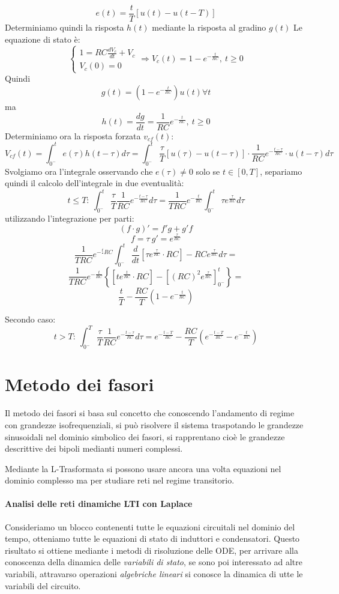 $$
e(t) = \frac{t}{T}\left[u(t) - u(t-T)\right]
$$
Determiniamo quindi la risposta $h(t)$ mediante la risposta al gradino $g(t)$
Le equazione di stato è:
$$
\begin{cases}
1 = RC\frac{dV_c}{dt} + V_c \\
V_c(0) = 0 
\end{cases}
\Rightarrow V_c(t) = 1 - e^{-\frac{t}{RC}},\ t\geq 0$$
Quindi 
$$
g(t) = (1 - e^{-\frac{t}{RC}})u(t) \forall t
$$
ma
$$
h(t) = \frac{dg}{dt} = \frac{1}{RC}e^{-\frac{t}{RC}},\ t\geq 0
$$
Determiniamo ora la risposta forzata $v_{cf}(t)$:
$$
V_{cf}(t) = \int_{0^-}^{t} e(\tau) h(t-\tau)d\tau = \int_{0^-}^{t}\frac{\tau}{T}\left[u(\tau) - u(t-\tau)\right]
\cdot \frac{1}{RC} e ^{-\frac{t-\tau}{RC}}\cdot u(t-\tau)d\tau
$$
Svolgiamo ora l'integrale osservando che $e(\tau) \neq 0 $ solo se $t \in [0,T]$, separiamo quindi
il calcolo dell'integrale in due eventualità:
$$
t\leq T:\ \int_{0^-}^{t}\frac{\tau}{T}\frac{1}{RC}e^{-\frac{t-\tau}{RC}}d\tau = \frac{1}{TRC}e^{-\frac{t}{RC}}\int_{0^-}^{t}\tau e^{\frac{\tau}{RC}}d\tau 
$$
utilizzando l'integrazione per parti:
$$
\left(f\cdot g\right)' = f'g + g'f
$$
$$
f = \tau\ g' = e^{\frac{\tau}{RC}}
$$
$$
\frac{1}{TRC}e^{-\frac{t}{}RC}\int_{0^-}^{t}\frac{d}{dt}\left[\tau e^{\frac{\tau}{RC}}\cdot RC \right] -
RC e^{\frac{\tau}{RC}} d\tau =
$$
$$
\frac{1}{TRC} e^{-\frac{t}{RC}} \left\{ \left[t e^{\frac{t}{RC}}\cdot RC \right] - \left[(RC)^2 e^{\frac{\tau}{RC}} \right]_{0^-}^{t}  \right\} =
$$
$$
\frac{t}{T} - \frac{RC}{T}\left(1-e^{-\frac{t}{RC}}\right)
$$

Secondo caso:
$$
t > T:\ \int_{0^-}^{T} \frac{\tau}{T}\frac{1}{RC} e^{-\frac{t-\tau}{RC}}d\tau =  e^{-\frac{t-T}{RC}}-\frac{RC}{T}\left(e^{-\frac{t-T}{RC}} -e^{-\frac{t}{RC}} \right)
$$

\section{Metodo dei fasori}
Il metodo dei fasori si basa sul concetto che conoscendo l'andamento di regime con grandezze isofrequenziali, si può risolvere il sistema traspotando le grandezze sinusoidali nel dominio simbolico
dei fasori, si rapprentano cioè le grandezze descrittive dei bipoli medianti numeri complessi.

Mediante la L-Trasformata si possono usare ancora una volta equazioni nel dominio complesso ma per 
studiare reti nel regime transitorio.

\paragraph{Analisi delle reti dinamiche LTI con Laplace}
Consideriamo un blocco contenenti tutte le equazioni circuitali nel dominio del tempo,
otteniamo tutte le equazioni di stato di induttori e condensatori.
Questo risultato si ottiene mediante i metodi di risoluzione delle ODE, per arrivare alla conoscenza
della dinamica delle \textit{variabili di stato}, se sono poi interessato ad altre variabili, attravarso
operazioni \textit{algebriche lineari} si conosce la dinamica di utte le variabili del circuito.

